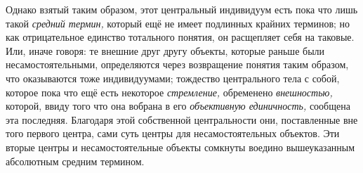 Однако взятый таким образом, этот центральный индивидуум есть
пока что лишь такой {\em средний
термин,} который ещё не имеет подлинных крайних терминов; но
как отрицательное единство тотального понятия, он расщепляет себя на
таковые. Или, иначе говоря: те внешние друг другу объекты, которые раньше
были несамостоятельными, определяются через возвращение понятия таким
образом, что оказываются тоже индивидуумами; тождество центрального тела с
собой, которое пока что ещё есть некоторое {\em стремление,} обременено
{\em внешностью,} которой, ввиду того что она вобрана в его
{\em объективную единичность,} сообщена эта последняя.
Благодаря этой собственной
центральности они, поставленные вне того первого центра, сами суть центры
для несамостоятельных объектов. Эти вторые центры и несамостоятельные
объекты сомкнуты воедино вышеуказанным абсолютным средним
термином.

